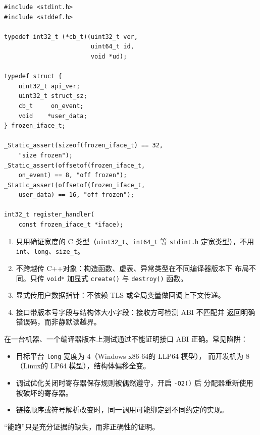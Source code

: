 \documentclass[12pt,a4paper,fontset=fandol]{ctexbook}
\newcommand{\cpp}[1]{C++#1}
\newcommand{\Fn}[1]{\texttt{#1()}}
\newcommand{\Tp}[1]{\texttt{#1}}
\newcommand{\Nix}{\textsf{Linux}}
\newcommand{\Win}{\textsf{Windows}}
\newcommand{\xSixtyFour}{\textsf{x86-64}}
\begin{document}
\begin{lstlisting}[style=cstyle, caption={回调接口冻结模板（示意）}]
#include <stdint.h>
#include <stddef.h>

typedef int32_t (*cb_t)(uint32_t ver,
                        uint64_t id,
                        void *ud);

typedef struct {
    uint32_t api_ver;
    uint32_t struct_sz;
    cb_t     on_event;
    void    *user_data;
} frozen_iface_t;

_Static_assert(sizeof(frozen_iface_t) == 32,
    "size frozen");
_Static_assert(offsetof(frozen_iface_t,
    on_event) == 8, "off frozen");
_Static_assert(offsetof(frozen_iface_t,
    user_data) == 16, "off frozen");

int32_t register_handler(
    const frozen_iface_t *iface);
\end{lstlisting}

\begin{bestpractice}[title={跨镜像纪律}]
\begin{enumerate}
\item 只用确证宽度的 C 类型（\Tp{uint32\_t}、\Tp{int64\_t} 等
      \Tp{stdint.h} 定宽类型），不用 \Tp{int}、\Tp{long}、\Tp{size\_t}。
\item 不跨越传 \cpp 对象：构造函数、虚表、异常类型在不同编译器版本下
      布局不同。只传 \Tp{void*} 加显式 \Fn{create} 与 \Fn{destroy} 函数。
\item 显式传用户数据指针：不依赖 TLS 或全局变量做回调上下文传递。
\item 接口带版本号字段与结构体大小字段：接收方可检测 ABI 不匹配并
      返回明确错误码，而非静默读越界。
\end{enumerate}
\end{bestpractice}

\begin{warning}[title={本机测试不足}]
在一台机器、一个编译器版本上测试通过不能证明接口 ABI 正确。常见陷阱：
\begin{itemize}
\item 目标平台 \Tp{long} 宽度为 4（\Win{} \xSixtyFour 的 LLP64 模型），
      而开发机为 8（\Nix 的 LP64 模型），结构体偏移全变。
\item 调试优化关闭时寄存器保存规则被偶然遵守，开启 \Fn{-O2} 后
      分配器重新使用被破坏的寄存器。
\item 链接顺序或符号解析改变时，同一调用可能绑定到不同约定的实现。
\end{itemize}
``能跑''只是充分证据的缺失，而非正确性的证明。
\end{warning}
\end{document}
